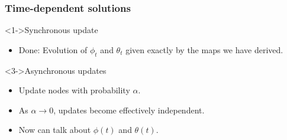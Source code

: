 \begin{frame}
  \frametitle{Time-dependent solutions}

  \begin{block}<1->{Synchronous update}
    \begin{itemize}
    \item<2-> Done: Evolution of $\phi_t$ and $\theta_t$
      given exactly by the maps we have
      derived.
    \end{itemize}
  \end{block}

  \begin{block}<3->{Asynchronous updates}
    \begin{itemize}
    \item<3-> 
      Update nodes with probability $\alpha$.
    \item<4-> 
      As $\alpha \rightarrow 0$, updates become
      effectively independent.
    \item<5-> 
      Now can talk about $\phi(t)$ and $\theta(t)$.
    \end{itemize}
  \end{block}

\end{frame}

